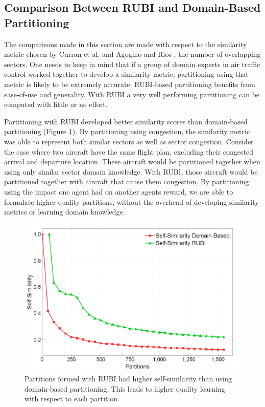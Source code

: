 \documentclass{aamas2014}
\begin{document}
\subsection{Comparison Between RUBI and Domain-Based Partitioning}

The comparisons made in this section are made with respect to the similarity metric chosen by Curran et al. \cite{Curran:2013:AHC:2484920.2485183} and Agogino and Rios \cite{Agogino:2009:EEM:1570256.1570258, Rios}, the number of overlapping sectors. One needs to keep in mind that if a group of domain experts in air traffic control worked together to develop a similarity metric, partitioning using that metric is likely to be extremely accurate. RUBI-based partitioning benefits from ease-of-use and generality. With RUBI a very well performing partitioning can be computed with little or no effort.

Partitioning with RUBI developed better similarity scores than domain-based partitioning (Figure \ref{Self-SimOldvsSelf-SimNew}). By partitioning using congestion, the similarity metric was able to represent both similar sectors as well as sector congestion. Consider the case where two aircraft have the same flight plan, excluding their congested arrival and departure location. These aircraft would be partitioned together when using only similar sector domain knowledge. With RUBI, those aircraft would be partitioned together with aircraft that cause them congestion. By partitioning using the impact one agent had on another agents reward, we are able to formulate higher quality partitions, without the overhead of developing similarity metrics or learning domain knowledge.

\begin{figure}
\centering
\includegraphics[width=1.0\columnwidth]{Self-SimOldvsSelf-SimNew}
\caption{Partitions formed with RUBI had higher self-similarity than using domain-based partitioning. This leads to higher quality learning with respect to each partition.}
\label{Self-SimOldvsSelf-SimNew}
\end{figure}
\end{document}

